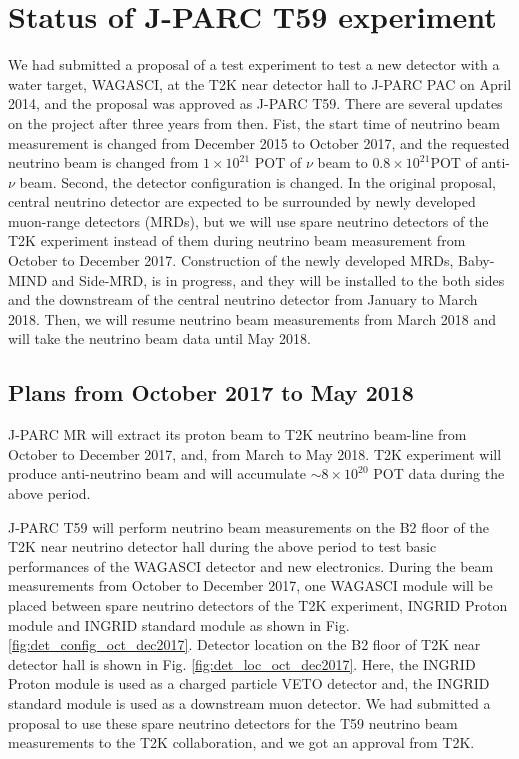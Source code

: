 \section{Status of J-PARC T59 experiment}
We had submitted a proposal of a test experiment to test a new detector with a water target, WAGASCI, at the T2K near detector hall to J-PARC PAC on April 2014, and the proposal was approved as J-PARC T59.
 There are several updates on the project after three years from then.
 Fist, the start time of neutrino beam measurement is changed from December 2015 to October 2017, and the requested neutrino beam is changed from $1\times10^{21}$ POT of $\nu$ beam to $0.8\times10^{21} $POT of anti-$\nu$ beam. 
 Second, the detector configuration is changed. In the original proposal, central neutrino detector are expected to be surrounded by newly developed muon-range detectors (MRDs), but we will use spare neutrino detectors of the T2K experiment instead of them during neutrino beam measurement from October to December 2017. Construction of the newly developed MRDs, Baby-MIND and Side-MRD, is in progress, and they will be installed to the both sides and the downstream of the central neutrino detector from January to March 2018. Then, we will resume neutrino beam measurements from March 2018 and will take the neutrino beam data until May 2018.

\subsection{Plans from October 2017 to May 2018}
J-PARC MR will extract its proton beam to T2K neutrino beam-line from October to December 2017, and, from March to May 2018. T2K experiment will produce anti-neutrino beam and will accumulate $\sim8\times10^{20}$ POT data during the above period.


 J-PARC T59 will perform neutrino beam measurements on the B2 floor of the T2K near neutrino detector hall during the above period to test basic performances of the WAGASCI detector and new electronics. During the beam measurements from October to December 2017, one WAGASCI module will be placed between spare neutrino detectors of the T2K experiment, INGRID Proton module and INGRID standard module as shown in Fig. \ref{fig:det_config_oct_dec2017}.
Detector location on the B2 floor of T2K near detector hall is shown in Fig. \ref{fig:det_loc_oct_dec2017}. Here, the INGRID Proton module is used as a charged particle VETO detector and, the INGRID standard module is used as a downstream muon detector. 
We had submitted a proposal to use these spare neutrino detectors for the T59 neutrino beam measurements to the T2K collaboration, and we got an approval from T2K. 

